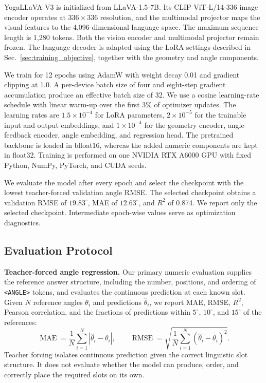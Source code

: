 \documentclass[conference]{IEEEtran}
\begin{document}
YogaLLaVA V3 is initialized from LLaVA-1.5-7B.
Its CLIP ViT-L/14-336 image encoder operates at $336\!\times\!336$ resolution, and the multimodal projector maps the visual features to the 4,096-dimensional language space.
The maximum sequence length is 1,280 tokens.
Both the vision encoder and multimodal projector remain frozen.
The language decoder is adapted using the LoRA settings described in Sec.~\ref{sec:training_objective}, together with the geometry and angle components.

We train for 12 epochs using AdamW with weight decay 0.01 and gradient clipping at 1.0.
A per-device batch size of four and eight-step gradient accumulation produce an effective batch size of 32.
We use a cosine learning-rate schedule with linear warm-up over the first 3\% of optimizer updates.
The learning rates are $1.5\!\times\!10^{-4}$ for LoRA parameters, $2\!\times\!10^{-5}$ for the trainable input and output embeddings, and $1\!\times\!10^{-4}$ for the geometry encoder, angle-feedback encoder, angle embedding, and regression head.
The pretrained backbone is loaded in bfloat16, whereas the added numeric components are kept in float32.
Training is performed on one NVIDIA RTX A6000 GPU with fixed Python, NumPy, PyTorch, and CUDA seeds.

We evaluate the model after every epoch and select the checkpoint with the lowest teacher-forced validation angle RMSE.
The selected checkpoint obtains a validation RMSE of $19.83^\circ$, MAE of $12.63^\circ$, and $R^2$ of 0.874.
We report only the selected checkpoint.
Intermediate epoch-wise values serve as optimization diagnostics.

\subsection{Evaluation Protocol}
\label{sec:evaluation_protocol}

\noindent\textbf{Teacher-forced angle regression.}
Our primary numeric evaluation supplies the reference answer structure, including the number, positions, and ordering of \texttt{<ANGLE>} tokens, and evaluates the continuous prediction at each known slot.
Given $N$ reference angles $\theta_i$ and predictions $\widehat{\theta}_i$, we report MAE, RMSE, $R^2$, Pearson correlation, and the fractions of predictions within $5^\circ$, $10^\circ$, and $15^\circ$ of the references:
\begin{equation}
\operatorname{MAE}=\frac{1}{N}\sum_{i=1}^{N}
\left|\widehat{\theta}_i-\theta_i\right|,
\qquad
\operatorname{RMSE}=\sqrt{\frac{1}{N}\sum_{i=1}^{N}
(\widehat{\theta}_i-\theta_i)^2}.
\label{eq:evaluation_errors}
\end{equation}
Teacher forcing isolates continuous prediction given the correct linguistic slot structure.
It does not evaluate whether the model can produce, order, and correctly place the required slots on its own.
\end{document}
